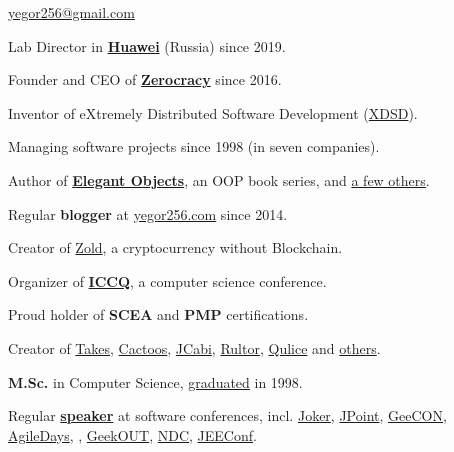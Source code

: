 \documentclass{yb}
\begin{document}
\ybPrintPhoto{}

{\scshape\bfseries\Large {}}\newline
\href{mailto:yegor256@gmail.com}{yegor256@gmail.com}

\vspace{1em}

Lab Director in \textbf{\href{https://www.huawei.com}{Huawei}} (Russia) since 2019.

Founder and CEO of \textbf{\href{https://www.zerocracy.com}{Zerocracy}} since 2016.

Inventor of eXtremely Distributed Software Development (\href{https://www.xdsd.org}{XDSD}).

Managing software projects since 1998 (in seven companies).

Author of \textbf{\href{https://www.yegor256.com/elegant-objects.html}{Elegant Objects}},
  an OOP book series, and \href{https://www.yegor256.com/books.html}{a few others}.

Regular \textbf{blogger} at \href{https://www.yegor256.com/}{yegor256.com} since 2014.

Creator of \href{https://www.zold.io}{Zold}, a cryptocurrency without Blockchain.

Organizer of \href{https://www.iccq.ru}{\textbf{ICCQ}}, a computer science conference.

Proud holder of \textbf{SCEA} and
  \textbf{PMP} certifications.

Creator of \href{http://www.takes.org}{Takes},
  \href{http://www.cactoos.org}{Cactoos},
  \href{http://www.jcabi.com}{JCabi},
  \href{http://www.rultor.com}{Rultor},
  \href{http://www.qulice.com}{Qulice} and
  \href{https://www.yegor256.com/pets.html}{others}.

\textbf{M.Sc.} in Computer Science,
  \href{https://en.wikipedia.org/wiki/Oles_Honchar_Dnipro_National_University}{graduated} in 1998.

Regular \textbf{\href{https://www.yegor256.com/talks.html}{speaker}}
  at software conferences, incl.
  \href{https://youtu.be/55mwAbuDrV8}{Joker},
  \href{https://www.youtube.com/watch?v=20QBvrHq6TA}{JPoint},
  \href{https://vimeo.com/177215750}{GeeCON},
  \href{https://www.youtube.com/watch?v=TLM9eN0b6zo}{AgileDays},
  \href{https://www.youtube.com/watch?v=03PXmPc7Q3g}{},
  \href{https://www.youtube.com/watch?v=7yTIWFZrXpg}{GeekOUT},
  \href{https://www.youtube.com/watch?v=vU_x6oK437I}{NDC},
  \href{https://www.youtube.com/watch?v=GS45LzE3LPQ}{JEEConf}.
\end{document}

